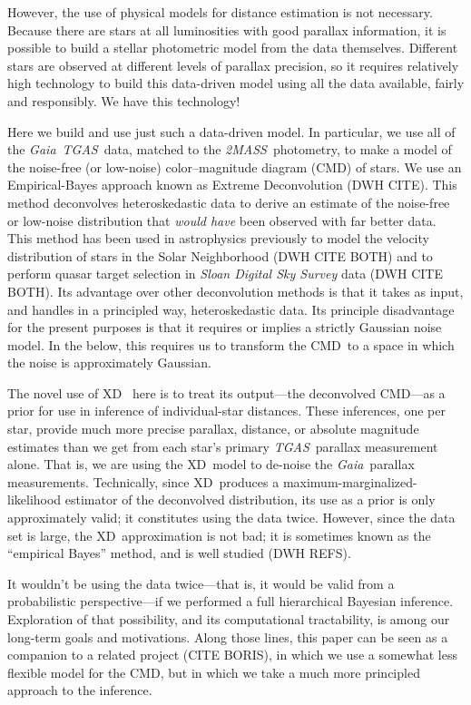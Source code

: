 \documentclass[12pt, preprint]{aastex6}
\newcommand{\acronym}[1]{{\small{#1}}}
\newcommand{\project}[1]{\textsl{#1}}
\newcommand{\tgas}{\project{\acronym{TGAS}}}
\newcommand{\tmass}{\project{\acronym{2MASS}}}
\newcommand{\gaia}{\project{Gaia}}
\newcommand{\xd}{\acronym{XD}}
\newcommand{\cmd}{\acronym{CMD}}
\begin{document}
However, the use of physical models for distance estimation is not necessary.
Because there are stars at all luminosities with good parallax information,
it is possible to build a stellar photometric model from the data themselves.
Different stars are observed at different levels of parallax precision,
so it requires relatively high technology to build this data-driven model
using all the data available, fairly and responsibly.
We have this technology!

Here we build and use just such a data-driven model.
In particular, we use all of the \gaia\ \tgas\ data, matched to the \tmass\
photometry, to make a model of the noise-free (or low-noise)
color--magnitude diagram (\cmd) of stars.
We use
an Empirical-Bayes approach known as Extreme Deconvolution (DWH CITE).
This method deconvolves heteroskedastic data to derive an estimate
of the noise-free or low-noise distribution that \emph{would have}
been observed with far better data.
This method has been used in astrophysics
previously to model the velocity distribution of stars in the Solar
Neighborhood (DWH CITE BOTH) and to perform quasar target selection
in \project{Sloan Digital Sky Survey} data (DWH CITE BOTH).
Its advantage over other deconvolution methods is that it takes as input,
and handles in a principled way, heteroskedastic data.
Its principle disadvantage for the present purposes is that it requires
or implies a strictly Gaussian noise model.
In the below, this requires us to transform the \cmd\ to a space in which
the noise is approximately Gaussian.

The novel use of \xd\ \citep{bovy11} here is to treat its output---the deconvolved \cmd---as
a prior for use in inference of individual-star distances.
These inferences, one per star, provide much more precise parallax, distance,
or absolute magnitude estimates than we get from each star's primary
\tgas\ parallax measurement alone.
That is, we are using the \xd\ model to de-noise the \gaia\ parallax
measurements.
Technically, since \xd\ produces a maximum-marginalized-likelihood estimator
of the deconvolved distribution,
its use as a prior is only approximately valid; it constitutes using the
data twice.
However, since the data set is large, the \xd\ approximation is not bad; it is
sometimes known as the ``empirical Bayes'' method, and is well studied (DWH REFS).

It wouldn't be using the data twice---that is, it would be valid from a
probabilistic perspective---if we performed a full hierarchical Bayesian
inference.
Exploration of that possibility, and its computational tractability,
is among our long-term goals and motivations.
Along those lines, this paper can be seen as a companion to
a related project (CITE BORIS), in which we use a
somewhat less flexible model for the \cmd, but in which we take a much more principled
approach to the inference.
\end{document}
